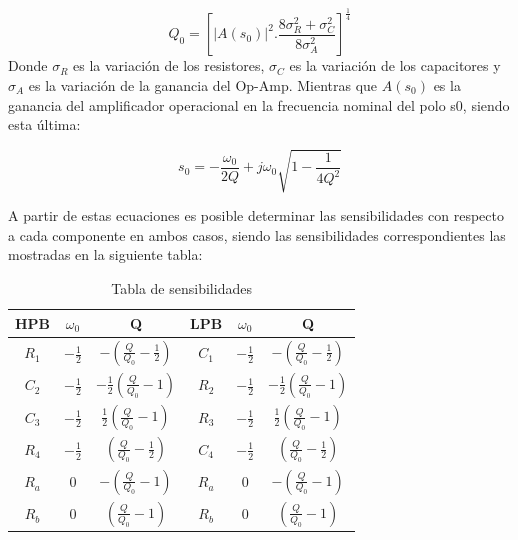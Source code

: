 \begin{equation}
Q_0 = \left[ |A(s_0)| ^2 . \frac{8\sigma_R^2 + \sigma_C^2}{8\sigma
_A^2} \right] ^\frac{1}{4}
\label{eq Q0}
\end{equation}
Donde $\sigma_R$ es la variación de los resistores, $\sigma_C$ es la variación de los capacitores y $\sigma_A$ es la variación de la ganancia del Op-Amp. Mientras que $A(s_0)$ es la ganancia del amplificador operacional en la frecuencia nominal del polo s0, siendo esta
última:

\begin{equation}
s_0 = -\frac{\omega_0}{2Q} + j\omega_0 \sqrt{1-\frac{1}{4Q^2}}
\label{eq s0}
\end{equation}

A partir de estas ecuaciones es posible determinar las sensibilidades con respecto a cada componente en ambos casos, siendo las sensibilidades correspondientes las mostradas en la siguiente tabla:

\begin{table}[h]
\begin{tabular}{@{}|c|c|c|c|c|c|@{}}
\toprule
\textbf{HPB} & \textbf{$\omega_0$} & \textbf{Q}                         & \textbf{LPB} & \textbf{$\omega_0$} & \textbf{Q}                         \\ 
\midrule
$R_1$         & $-\frac{1}{2}$                      & $-(\frac{Q}{Q_0} - \frac{1}{2})$    & $C_1$         & $-\frac{1}{2}$                      & $-(\frac{Q}{Q_0} - \frac{1}{2})$    \\
$C_2$         & $-\frac{1}{2}$                      & $-\frac{1}{2} (\frac{Q}{Q_0} - 1)$ & $R_2$         & $-\frac{1}{2}$                      & $-\frac{1}{2} (\frac{Q}{Q_0} - 1)$ \\
$C_3$         & $-\frac{1}{2}$                      & $\frac{1}{2} (\frac{Q}{Q_0} - 1)$  & $R_3$          & $-\frac{1}{2}$                      & $\frac{1}{2} (\frac{Q}{Q_0} - 1)$  \\
$R_4$         & $-\frac{1}{2}$                      & $(\frac{Q}{Q_0} - \frac{1}{2})$     & $C_4$         & $-\frac{1}{2}$                      & $(\frac{Q}{Q_0} - \frac{1}{2})$     \\
$R_a$         & 0                                   & $- (\frac{Q}{Q_0} - 1)$            & $R_a$         & 0                                   & $- (\frac{Q}{Q_0} - 1)$            \\
$R_b$         & 0                                   & $ (\frac{Q}{Q_0} - 1)$             & $R_b$         & 0                                   & $ (\frac{Q}{Q_0} - 1)$            
\end{tabular}
\centering
\caption{Tabla de sensibilidades}
\label{tabla sensibilidades}
\end{table}


